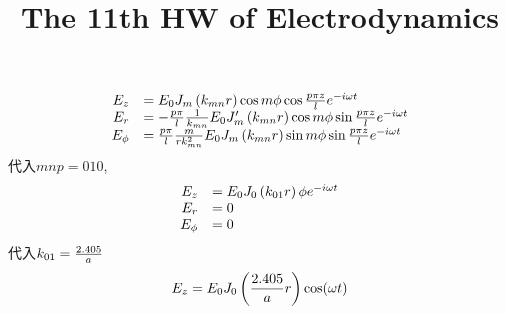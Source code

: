 \documentclass[UTF8,9pt]{ctexart}
\title{The 11th HW of Electrodynamics}
\begin{document}
 
\maketitle
{}
$$ 
\begin{array}{rl}
E_{z}&= E_{0} J_{m}\left(k_{m n} r\right) \cos m \phi \cos \frac{p \pi z}{l} e^{-i \omega t} \\ 
E_{r}&= -\frac{p \pi}{l} \frac{1}{k_{m n}} E_{0} J_{m}^{\prime}\left(k_{m n} r\right) \cos m \phi \sin \frac{p \pi z}{l} e^{-i \omega t}\\ 
E_{\phi}&= \frac{p \pi}{l} \frac{m}{r k_{m n}^{2}} E_{0} J_{m}\left(k_{m n} r\right) \sin m \phi \sin \frac{p \pi z}{l} e^{-i \omega t}
\end{array}
 $$
 代入$mnp=010$,
$$ 
\begin{array}{rl}
E_{z}&= E_{0} J_{0}\left(k_{0 1} r\right) \phi e^{-i \omega t} \\ 
E_{r}&= 0\\ 
E_{\phi}&= 0
\end{array}
 $$
代入$k_{01} = \frac{2.405}{a}$
$$E_{z} = E_{0} J_{0}\left(\frac{2.405}{a} r\right) \cos(\omega t)$$
\end{document}
